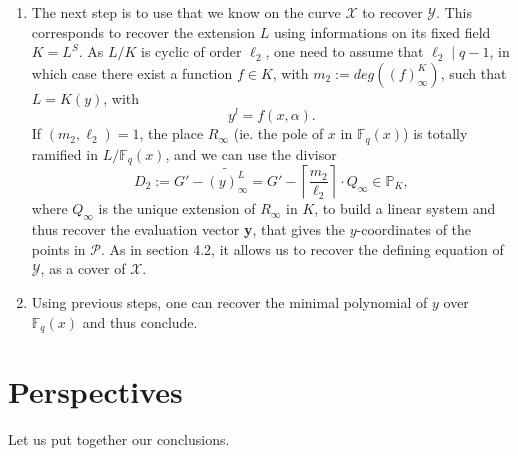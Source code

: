 \documentclass[10pt]{article}
\newcommand{\s}{\vspace{0.3cm}}
\newcommand{\cd}{\cdot}
\newcommand{\fq}{\mathbb{F}_q}
\newcommand{\X}{\mathcal{X}}
\newcommand{\Y}{\mathcal{Y}}
\newcommand{\PR}{\mathcal{P}}
\begin{document}
\begin{enumerate}
\item The next step is to use that we know on the curve $\X$ to recover $\Y$. This corresponds to recover the extension $L$ using informations on its fixed field $K=L^S$. As $L/K$ is cyclic of order $\ell_2$, one need to assume that $\ell_2 \mid q-1$, in which case there exist a function $f \in K$, with $m_2:= deg((f)^K_{\infty})$, such that $L=K(y)$, with
\[y^l = f(x,\alpha).\]   
If $(m_2,\ell_2)=1$, the place $R_{\infty}$ (ie. the pole of $x$ in $\fq(x)$) is totally ramified in $L/\fq(x)$, and we can use the divisor 
\[D_2 := G' - \widetilde{(y)^L_{\infty}} = G' - \left\lceil\frac{m_2}{\ell_2}\right\rceil \cd Q_{\infty} \in \mathbb{P}_{K},\]
where $Q_{\infty}$ is the unique extension of $R_{\infty}$ in $K$, to build a linear system and thus recover the evaluation vector \textbf{y}, that gives the $y$-coordinates of the points in $\PR$. As in section 4.2, it allows us to recover the defining equation of $\Y$, as a cover of $\X$.

\item Using previous steps, one can recover the minimal polynomial of $y$ over $\fq(x)$ and thus conclude.
\end{enumerate}

\s

\section{Perspectives}

Let us put together our conclusions.
\end{document}
